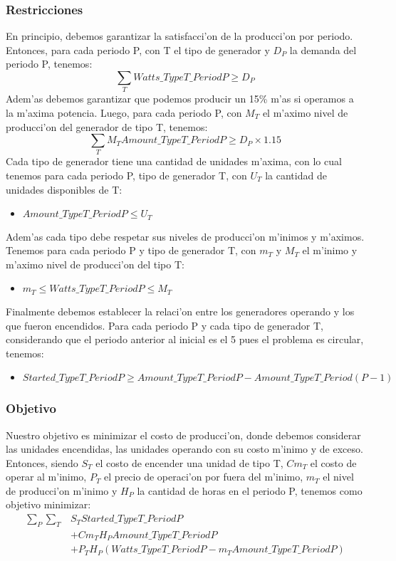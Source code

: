 \subsubsection{Restricciones}
En principio, debemos garantizar la satisfacci'on de la producci'on por periodo. Entonces, para cada periodo P, con T el tipo de generador y $D_{P}$ la demanda del periodo P, tenemos:
\begin{equation} \label{eq:demand}
\sum_{T}Watts\_TypeT\_PeriodP \geq D_{P}
\end{equation}
Adem'as debemos garantizar que podemos producir un 15\% m'as si operamos a la m'axima potencia. Luego, para cada periodo P, con $M_{T}$ el m'aximo nivel de producci'on del generador de tipo T, tenemos:
\begin{equation} \label{eq:extrademand}
\sum_{T} M_{T} Amount\_TypeT\_PeriodP \geq D_{P} \times 1.15
\end{equation}
Cada tipo de generador tiene una cantidad de unidades m'axima, con lo cual tenemos para cada periodo P, tipo de generador T, con $U_{T}$ la cantidad de unidades disponibles de T:
\begin{itemize}
\item $Amount\_TypeT\_PeriodP \leq U_{T}$
\end{itemize}
Adem'as cada tipo debe respetar sus niveles de producci'on m'inimos y m'aximos. Tenemos para cada periodo P y tipo de generador T, con $m_{T}$ y $M_{T}$ el m'inimo y m'aximo nivel de producci'on del tipo T:
\begin{itemize}
\item $m_{T} \leq Watts\_TypeT\_PeriodP \leq M_{T}$
\end{itemize}
Finalmente debemos establecer la relaci'on entre los generadores operando y los que fueron encendidos. Para cada periodo P y cada tipo de generador T, considerando que el periodo anterior al inicial es el 5 pues el problema es circular, tenemos:
\begin{itemize}
\item $Started\_TypeT\_PeriodP \geq Amount\_TypeT\_PeriodP - Amount\_TypeT\_Period(P-1)$
\end{itemize}
\subsubsection{Objetivo}
Nuestro objetivo es minimizar el costo de producci'on, donde debemos considerar las unidades encendidas, las unidades operando con su costo m'inimo y de exceso. Entonces, siendo $S_{T}$ el costo de encender una unidad de tipo T, $Cm_{T}$ el costo de operar al m'inimo, $P_{T}$ el precio de operaci'on por fuera del m'inimo, $m_{T}$ el nivel de producci'on m'inimo y $H_{P}$ la cantidad de horas en el periodo P, tenemos como objetivo minimizar:
\begin{equation} \label{eq:objective}
\begin{aligned}
\sum_{P} \sum_{T} 	& S_{T} Started\_TypeT\_PeriodP \\
				& + Cm_{T} H_{P} Amount\_TypeT\_PeriodP \\
 				& + P_{T} H_{P} (Watts\_TypeT\_PeriodP - m_{T} Amount\_TypeT\_PeriodP)
\end{aligned}
\end{equation}
